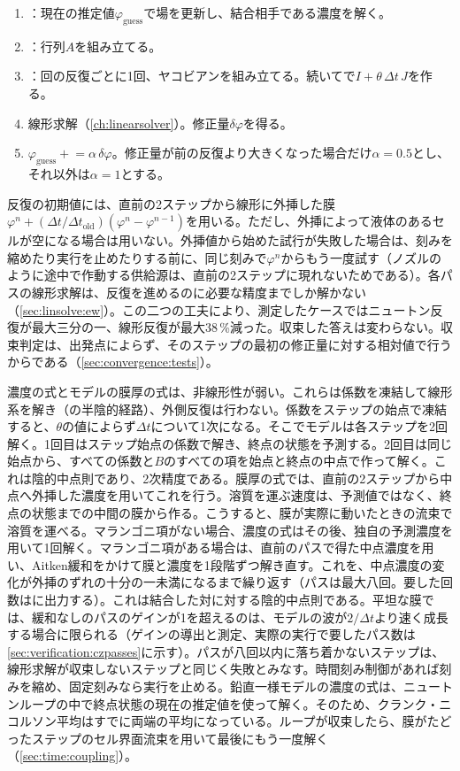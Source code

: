 \begin{enumerate}
  \item {}：現在の推定値$\varphi_{\mathrm{guess}}$で場を更新し、結合相手である濃度を解く。
  \item {}：行列$A$を組み立てる。
  \item {}：回の反復ごとに1回、ヤコビアンを組み立てる。続いてで$I + \theta\,\Delta t\,J$を作る。
  \item 線形求解（\cref{ch:linearsolver}）。修正量$\delta\varphi$を得る。
  \item $\varphi_{\mathrm{guess}} \mathrel{+}= \alpha\,\delta\varphi$。修正量が前の反復より大きくなった場合だけ$\alpha = 0.5$とし、それ以外は$\alpha = 1$とする。
\end{enumerate}

反復の初期値には、直前の2ステップから線形に外挿した膜$\varphi^n + (\Delta t/\Delta t_{\mathrm{old}})(\varphi^n -
\varphi^{n-1})$を用いる。ただし、外挿によって液体のあるセルが空になる場合は用いない。外挿値から始めた試行が失敗した場合は、刻みを縮めたり実行を止めたりする前に、同じ刻みで$\varphi^n$からもう一度試す（ノズルのように途中で作動する供給源は、直前の2ステップに現れないためである）。各パスの線形求解は、反復を進めるのに必要な精度までしか解かない（\cref{sec:linsolve:ew}）。この二つの工夫により、測定したケースではニュートン反復が最大三分の一、線形反復が最大38\,\%減った。収束した答えは変わらない。収束判定は、出発点によらず、そのステップの最初の修正量に対する相対値で行うからである（\cref{sec:convergence:tests}）。

濃度の式とモデルの膜厚の式は、非線形性が弱い。これらは係数を凍結して線形系を解き（の半陰的経路）、外側反復は行わない。係数をステップの始点で凍結すると、$\theta$の値によらず$\Delta t$について1次になる。そこでモデルは各ステップを2回解く。1回目はステップ始点の係数で解き、終点の状態を予測する。2回目は同じ始点から、すべての係数と$B$のすべての項を始点と終点の中点で作って解く。これは陰的中点則であり、2次精度である。膜厚の式では、直前の2ステップから中点へ外挿した濃度を用いてこれを行う。溶質を運ぶ速度は、予測値ではなく、終点の状態までの中間の膜から作る。こうすると、膜が実際に動いたときの流束で溶質を運べる。マランゴニ項がない場合、濃度の式はその後、独自の予測濃度を用いて1回解く。マランゴニ項がある場合は、直前のパスで得た中点濃度を用い、Aitken緩和をかけて膜と濃度を1段階ずつ解き直す。これを、中点濃度の変化が外挿のずれの十分の一未満になるまで繰り返す（パスは最大八回。要した回数はに出力する）。これは結合した対に対する陰的中点則である。平坦な膜では、緩和なしのパスのゲインが1を超えるのは、モデルの波が$2/\Delta t$より速く成長する場合に限られる（ゲインの導出と測定、実際の実行で要したパス数は\cref{sec:verification:czpasses}に示す）。パスが八回以内に落ち着かないステップは、線形求解が収束しないステップと同じく失敗とみなす。時間刻み制御があれば刻みを縮め、固定刻みなら実行を止める。鉛直一様モデルの濃度の式は、ニュートンループの中で終点状態の現在の推定値を使って解く。そのため、クランク・ニコルソン平均はすでに両端の平均になっている。ループが収束したら、膜がたどったステップのセル界面流束を用いて最後にもう一度解く（\cref{sec:time:coupling}）。


